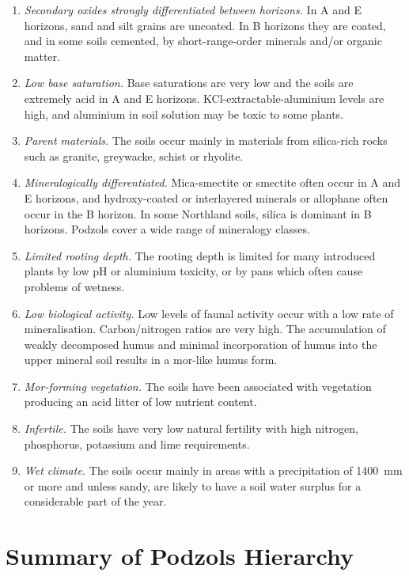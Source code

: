 \documentclass[
  letterpaper,
  DIV=11,
  numbers=noendperiod]{scrreprt}
\providecommand{\tightlist}{%
  \setlength{\itemsep}{0pt}\setlength{\parskip}{0pt}}\usepackage{longtable,booktabs,array}
\begin{document}
\begin{enumerate}
\def\labelenumi{\arabic{enumi}.}
\tightlist
\item
  \emph{Secondary oxides strongly differentiated between horizons.} In A
  and E horizons, sand and silt grains are uncoated. In B horizons they
  are coated, and in some soils cemented, by short-range-order minerals
  and/or organic matter.
\item
  \emph{Low base saturation.} Base saturations are very low and the
  soils are extremely acid in A and E horizons.
  KCl-extractable-aluminium levels are high, and aluminium in soil
  solution may be toxic to some plants.
\item
  \emph{Parent materials.} The soils occur mainly in materials from
  silica-rich rocks such as granite, greywacke, schist or rhyolite.
\item
  \emph{Mineralogically differentiated.} Mica-smectite or smectite often
  occur in A and E horizons, and hydroxy-coated or interlayered minerals
  or allophane often occur in the B horizon. In some Northland soils,
  silica is dominant in B horizons. Podzols cover a wide range of
  mineralogy classes.
\item
  \emph{Limited rooting depth.} The rooting depth is limited for many
  introduced plants by low pH or aluminium toxicity, or by pans which
  often cause problems of wetness.
\item
  \emph{Low biological activity.} Low levels of faunal activity occur
  with a low rate of mineralisation. Carbon/nitrogen ratios are very
  high. The accumulation of weakly decomposed humus and minimal
  incorporation of humus into the upper mineral soil results in a
  mor-like humus form.
\item
  \emph{Mor-forming vegetation.} The soils have been associated with
  vegetation producing an acid litter of low nutrient content.
\item
  \emph{Infertile.} The soils have very low natural fertility with high
  nitrogen, phosphorus, potassium and lime requirements.
\item
  \emph{Wet climate.} The soils occur mainly in areas with a
  precipitation of 1400~mm or more and unless sandy, are likely to have
  a soil water surplus for a considerable part of the year.
\end{enumerate}

\hypertarget{sec-sum-Z}{%
\section{Summary of Podzols Hierarchy}\label{sec-sum-Z}}
\end{document}

